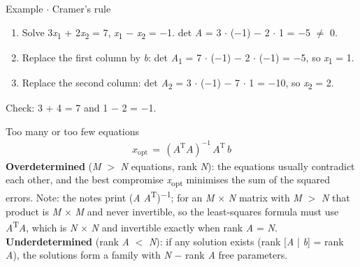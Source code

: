 \documentclass[11pt]{article}
\begin{document}
\begin{keepsection}
\begin{workedbox}{Example \ensuremath{\cdot} Cramer's rule}
\begin{enumerate}
\item Solve 3\textit{x}\textsubscript{1} + 2\textit{x}\textsubscript{2} = 7, \textit{x}\textsubscript{1} \ensuremath{-} \textit{x}\textsubscript{2} = \ensuremath{-}1. det \textit{A} = 3 \ensuremath{\cdot} (\ensuremath{-}1) \ensuremath{-} 2 \ensuremath{\cdot} 1 = \ensuremath{-}5 \ensuremath{\neq} 0.
\item Replace the first column by \textit{b}: det \textit{A}\textsubscript{1} = 7 \ensuremath{\cdot} (\ensuremath{-}1) \ensuremath{-} 2 \ensuremath{\cdot} (\ensuremath{-}1) = \ensuremath{-}5, so \textit{x}\textsubscript{1} = 1.
\item Replace the second column: det \textit{A}\textsubscript{2} = 3 \ensuremath{\cdot} (\ensuremath{-}1) \ensuremath{-} 7 \ensuremath{\cdot} 1 = \ensuremath{-}10, so \textit{x}\textsubscript{2} = 2.
\end{enumerate}

Check: 3 + 4 = 7 and 1 \ensuremath{-} 2 = \ensuremath{-}1.
\end{workedbox}

\begin{equationcard}{Too many or too few equations}
\[ \begin{gathered} {x}_{\text{opt}}\, =\, ({A}^{\mathrm{T}}{A})^{-1}\, {A}^{\mathrm{T}}\, {b} \end{gathered} \]
{\small \textbf{Overdetermined} (\textit{M} \ensuremath{>} \textit{N} equations, rank \textit{N}): the equations usually contradict each other, and the best compromise \textit{x}\textsubscript{opt} minimises the sum of the squared errors. Note: the notes print (\textit{A} \textit{A}\textsuperscript{T})\textsuperscript{\ensuremath{-}1}; for an \textit{M} \ensuremath{\times} \textit{N} matrix with \textit{M} \ensuremath{>} \textit{N} that product is \textit{M} \ensuremath{\times} \textit{M} and never invertible, so the least-squares formula must use \textit{A}\textsuperscript{T}\textit{A}, which is \textit{N} \ensuremath{\times} \textit{N} and invertible exactly when rank \textit{A} = \textit{N}. \textbf{Underdetermined} (rank \textit{A} \ensuremath{<} \textit{N}): if any solution exists (rank [\textit{A} | \textit{b}] = rank \textit{A}), the solutions form a family with \textit{N} \ensuremath{-} rank \textit{A} free parameters.}
\end{equationcard}
\end{keepsection}
\end{document}
